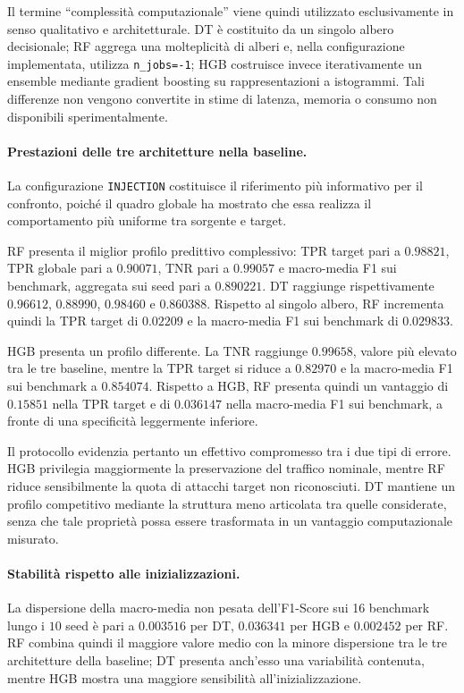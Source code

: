 Il termine ``complessità computazionale'' viene quindi utilizzato esclusivamente in senso qualitativo e architetturale. 
DT è costituito da un singolo albero decisionale; RF aggrega una molteplicità di alberi e, nella configurazione implementata, utilizza \texttt{n\_jobs=-1}; HGB costruisce invece iterativamente un ensemble mediante gradient boosting su rappresentazioni a istogrammi. 
Tali differenze non vengono convertite in stime di latenza, memoria o consumo non disponibili sperimentalmente.

\paragraph{Prestazioni delle tre architetture nella baseline.}
La configurazione \texttt{INJECTION} costituisce il riferimento più informativo per il confronto, poiché il quadro globale ha mostrato che essa realizza il comportamento più uniforme tra sorgente e target.

RF presenta il miglior profilo predittivo complessivo: TPR target pari a $0.98821$, TPR globale pari a $0.90071$, TNR pari a $0.99057$ e macro-media F1 sui benchmark, aggregata sui seed pari a $0.890221$. 
DT raggiunge rispettivamente $0.96612$, $0.88990$, $0.98460$ e $0.860388$. 
Rispetto al singolo albero, RF incrementa quindi la TPR target di $0.02209$ e la macro-media F1 sui benchmark di $0.029833$.

HGB presenta un profilo differente. 
La TNR raggiunge $0.99658$, valore più elevato tra le tre baseline, mentre la TPR target si riduce a $0.82970$ e la macro-media F1 sui benchmark a $0.854074$. 
Rispetto a HGB, RF presenta quindi un vantaggio di $0.15851$ nella TPR target e di $0.036147$ nella macro-media F1 sui benchmark, a fronte di una specificità leggermente inferiore.

Il protocollo evidenzia pertanto un effettivo compromesso tra i due tipi di errore. 
HGB privilegia maggiormente la preservazione del traffico nominale, mentre RF riduce sensibilmente la quota di attacchi target non riconosciuti.
DT mantiene un profilo competitivo mediante la struttura meno articolata tra quelle considerate, senza che tale proprietà possa essere trasformata in un vantaggio computazionale misurato.

\paragraph{Stabilità rispetto alle inizializzazioni.}
La dispersione della macro-media non pesata dell'F1-Score sui 16 benchmark lungo i $10$ seed è pari a $0.003516$ per DT, $0.036341$ per HGB e $0.002452$ per RF. 
RF combina quindi il maggiore valore medio con la minore dispersione tra le tre architetture della baseline; DT presenta anch'esso una variabilità contenuta, mentre HGB mostra una maggiore sensibilità all'inizializzazione.

